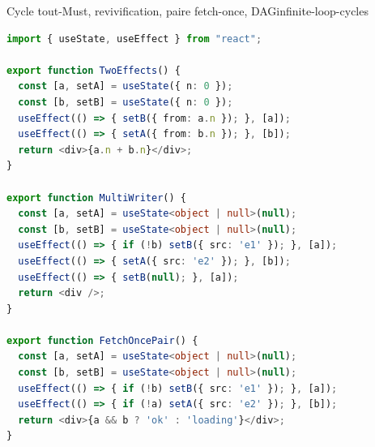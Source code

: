 \begin{exemple}{Cycle tout-Must, revivification, paire fetch-once, DAG}{infinite-loop-cycles}
\begin{lstlisting}[language=TypeScript,caption={\file{/tmp/ch19/cycles.tsx}},label={lst:infinite-loop-cycles}]
import { useState, useEffect } from "react";

export function TwoEffects() {
  const [a, setA] = useState({ n: 0 });
  const [b, setB] = useState({ n: 0 });
  useEffect(() => { setB({ from: a.n }); }, [a]);
  useEffect(() => { setA({ from: b.n }); }, [b]);
  return <div>{a.n + b.n}</div>;
}

export function MultiWriter() {
  const [a, setA] = useState<object | null>(null);
  const [b, setB] = useState<object | null>(null);
  useEffect(() => { if (!b) setB({ src: 'e1' }); }, [a]);
  useEffect(() => { setA({ src: 'e2' }); }, [b]);
  useEffect(() => { setB(null); }, [a]);
  return <div />;
}

export function FetchOncePair() {
  const [a, setA] = useState<object | null>(null);
  const [b, setB] = useState<object | null>(null);
  useEffect(() => { if (!b) setB({ src: 'e1' }); }, [a]);
  useEffect(() => { if (!a) setA({ src: 'e2' }); }, [b]);
  return <div>{a && b ? 'ok' : 'loading'}</div>;
}


\end{lstlisting}
\end{exemple}
